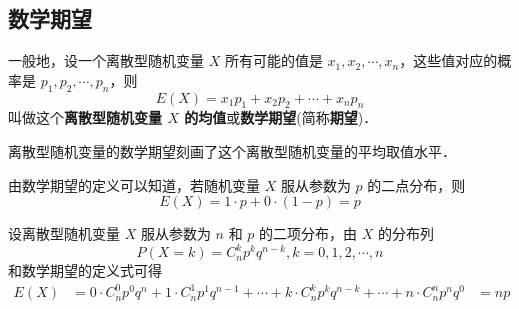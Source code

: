
\begin{issues}
\issueDraft
\end{issues}

\subsection{数学期望}
一般地，设一个离散型随机变量 $X$ 所有可能的值是 $x_1,x_2,\cdots,x_n$，这些值对应的概率是 $p_1,p_2,\cdots,p_n$，则
\begin{equation}
E(X) = x_1p_1 + x_2p_2 + \cdots + x_np_n
\end{equation}
叫做这个\textbf{离散型随机变量 $X$ 的均值}或\textbf{数学期望}(简称\textbf{期望})．

离散型随机变量的数学期望刻画了这个离散型随机变量的平均取值水平．

由数学期望的定义可以知道，若随机变量 $X$ 服从参数为 $p$ 的二点分布，则
\begin{equation}
E(X) = 1 \cdot p + 0 \cdot(1 - p) = p
\end{equation}

设离散型随机变量 $X$ 服从参数为 $n$ 和 $p$ 的二项分布，由 $X$ 的分布列
\begin{equation}
P(X = k) = C_n^kp^kq^{n-k},k=0,1,2,\cdots ,n
\end{equation}
和数学期望的定义式可得
\begin{equation}
\begin{aligned}
E(X) &= 0\cdot C_n^0p^0q^n+1\cdot C_n^1p^1q^{n-1}+\cdots +k\cdot C_n^kp^kq^{n-k}+\cdots +n\cdot C_n^np^nq^0
&=np
\end{aligned}
\end{equation}